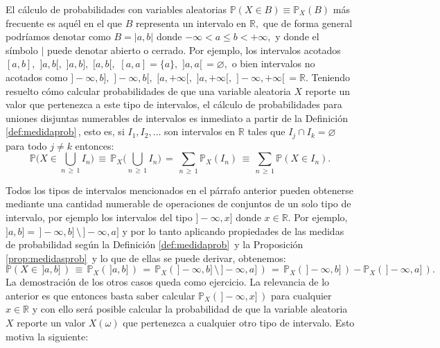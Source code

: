 \documentclass[spanish,10pt,letterpaper]{article}
\newcommand{\prob}{\mathbb{P}}
\newcommand{\Runo}{\mathbb{R}}
\begin{document}
	El cálculo de probabilidades con variables aleatorias $\prob(X\in B)\equiv\prob_X(B)$ más frecuente es aquél en el que $B$ representa un intervalo en $\Runo,$ que de forma general podríamos denotar como $B=|a,b|$ donde $-\infty<a\leq b< +\infty,$ y donde el símbolo $|$ puede denotar abierto o cerrado. Por ejemplo, los intervalos acotados $[a,b],$ $]a,b[,$ $]a,b],$ $[a,b[,$ $[a,a]=\{a\},$ $]a,a[\,=\varnothing,$ o bien intervalos no acotados como $]-\infty,b],$ $]-\infty,b[,$ $[a,+\infty[,$ $]a,+\infty[,$ $]-\infty,+\infty[\,=\Runo.$ Teniendo resuelto cómo calcular probabilidades de que una variable aleatoria $X$ reporte un valor que pertenezca a este tipo de intervalos, el cálculo de probabilidades para uniones disjuntas numerables de intervalos es inmediato a partir de la Definición \ref{def:medidaprob}\,, esto es, si $I_1,I_2,\ldots$ son intervalos en $\Runo$ tales que $I_j\cap I_k=\varnothing$ para todo $j\neq k$ entonces:
	\begin{equation}\label{eq:uniondisjint}
	\prob\bigg(X\in\bigcup_{n\,\geq\,1}I_n\bigg) \,\equiv\, \prob_X\bigg(\bigcup_{n\,\geq\,1}I_n\bigg) \,=\, \sum_{n\,\geq\,1}\prob_X(I_n) \,\equiv\, \sum_{n\,\geq\,1}\prob(X\in I_n).
	\end{equation}
	
	\medskip 
	
	Todos los tipos de intervalos mencionados en el párrafo anterior pueden obtenerse mediante una cantidad numerable de operaciones de conjuntos de un solo tipo de intervalo, por ejemplo los intervalos del tipo $]-\infty,x]$ donde $x\in\Runo.$ Por ejemplo, $]a,b]=\,]-\infty,b]\,\setminus\,]-\infty,a]$ y por lo tanto aplicando propiedades de las medidas de probabilidad según la Definición \ref{def:medidaprob}\, y la Proposición \ref{prop:medidasprob}\, y lo que de ellas se puede derivar, obtenemos:
	\begin{equation}\label{eq:intsemiabierto}
	   \prob(X\in\,]a,b]\,) \,\equiv\, \prob_X(\,]a,b]\,) \,=\, \prob_X(\,]-\infty,b]\,\setminus\,]-\infty,a]\,) \,=\, \prob_X(\,]-\infty,b]\,) - \prob_X(\,]-\infty,a]\,).
	\end{equation}
	La demostración de los otros casos queda como ejercicio. La relevancia de lo anterior es que entonces basta saber calcular $\prob_X(\,]-\infty,x]\,)$ para cualquier $x\in\Runo$ y con ello será posible calcular la probabilidad de que la variable aleatoria $X$ reporte un valor $X(\omega)$ que pertenezca a cualquier otro tipo de intervalo. Esto motiva la siguiente:
	
	\bigskip 
	
\end{document}
